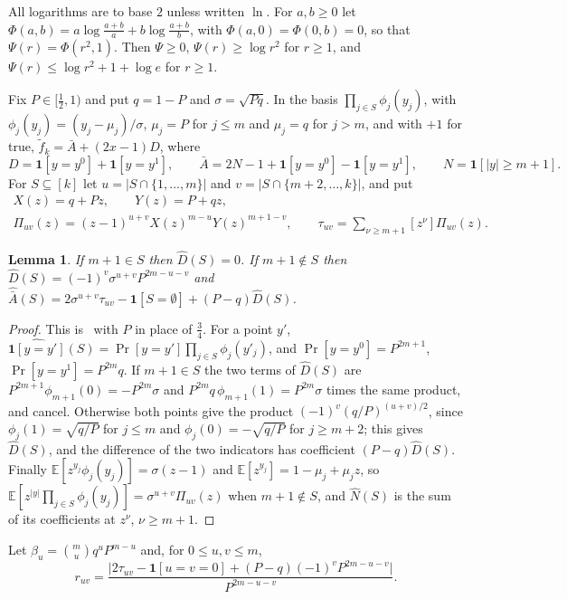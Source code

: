 \documentclass[11pt]{amsart}
\newtheorem{lemma}[theorem]{Lemma}
\theoremstyle{remark}
\newcommand{\E}{\mathbb{E}}
\begin{document}
All logarithms are to base $2$ unless written $\ln$. For $a,b\ge0$ let $\Phi(a,b)=a\log\frac{a+b}{a}+b\log\frac{a+b}{b}$,
with $\Phi(a,0)=\Phi(0,b)=0$, so that $\Psi(r)=\Phi(r^2,1)$. Then $\Psi\ge0$, $\Psi(r)\ge\log r^2$ for $r\ge1$, and
$\Psi(r)\le\log r^2+1+\log e$ for $r\ge1$.

Fix $P\in[\frac12,1)$ and put $q=1-P$ and $\sigma=\sqrt{Pq}$. In the basis $\prod_{j\in S}\phi_j(y_j)$, with
$\phi_j(y_j)=(y_j-\mu_j)/\sigma$, $\mu_j=P$ for $j\le m$ and $\mu_j=q$ for $j>m$, and with $+1$ for true,
$\tilde f_k=\bar A+(2x-1)D$, where
\[
D=\mathbf 1[y=y^0]+\mathbf 1[y=y^1],\qquad \bar A=2N-1+\mathbf 1[y=y^0]-\mathbf 1[y=y^1],\qquad
N=\mathbf 1[|y|\ge m+1].
\]
For $S\subseteq[k]$ let $u=|S\cap\{1,\dots,m\}|$ and $v=|S\cap\{m+2,\dots,k\}|$, and put
\begin{gather*}
X(z)=q+Pz,\qquad Y(z)=P+qz,\\
\Pi_{uv}(z)=(z-1)^{u+v}X(z)^{m-u}Y(z)^{m+1-v},\qquad \tau_{uv}=\sum_{\nu\ge m+1}[z^\nu]\Pi_{uv}(z).
\end{gather*}

\begin{lemma}\label{lem:coef}
If $m+1\in S$ then $\hat D(S)=0$. If $m+1\notin S$ then $\hat D(S)=(-1)^v\sigma^{u+v}P^{2m-u-v}$ and
$\hat{\bar A}(S)=2\sigma^{u+v}\tau_{uv}-\mathbf 1[S=\emptyset]+(P-q)\hat D(S)$.
\end{lemma}

\begin{proof}
This is~\cite[Lemma~1]{Shm9} with $P$ in place of $\frac34$. For a point $y'$,
$\widehat{\mathbf 1[y=y']}(S)=\Pr[y=y']\prod_{j\in S}\phi_j(y'_j)$, and $\Pr[y=y^0]=P^{2m+1}$, $\Pr[y=y^1]=P^{2m}q$. If
$m+1\in S$ the two terms of $\hat D(S)$ are $P^{2m+1}\phi_{m+1}(0)=-P^{2m}\sigma$ and $P^{2m}q\,\phi_{m+1}(1)=P^{2m}\sigma$
times the same product, and cancel. Otherwise both points give the product $(-1)^v(q/P)^{(u+v)/2}$, since
$\phi_j(1)=\sqrt{q/P}$ for $j\le m$ and $\phi_j(0)=-\sqrt{q/P}$ for $j\ge m+2$; this gives $\hat D(S)$, and the
difference of the two indicators has coefficient $(P-q)\hat D(S)$. Finally $\E[z^{y_j}\phi_j(y_j)]=\sigma(z-1)$ and
$\E[z^{y_j}]=1-\mu_j+\mu_jz$, so $\E[z^{|y|}\prod_{j\in S}\phi_j(y_j)]=\sigma^{u+v}\Pi_{uv}(z)$ when $m+1\notin S$, and
$\hat N(S)$ is the sum of its coefficients at $z^\nu$, $\nu\ge m+1$.
\end{proof}

Let $\beta_u=\binom mu q^uP^{m-u}$ and, for $0\le u,v\le m$,
\[
r_{uv}=\frac{\bigl|2\tau_{uv}-\mathbf 1[u=v=0]+(P-q)(-1)^vP^{2m-u-v}\bigr|}{P^{2m-u-v}}.
\]
\end{document}

